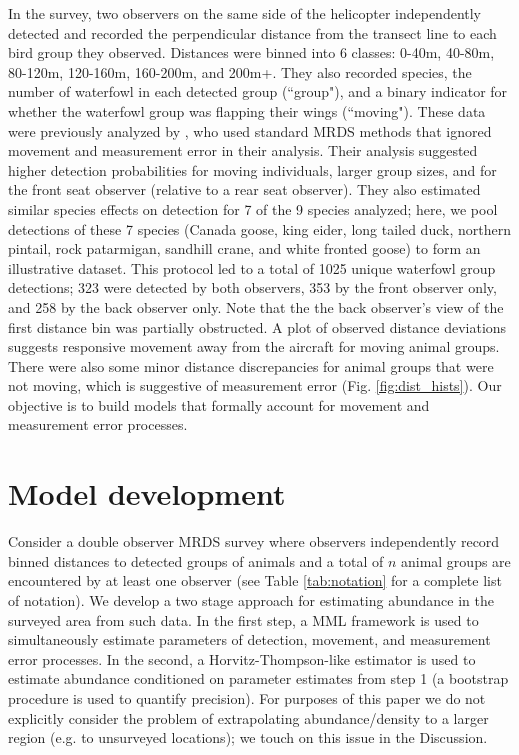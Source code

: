 \documentclass[12pt,fleqn]{article}
\begin{document}
In the survey, two observers on the same side of the helicopter independently detected and recorded the perpendicular distance from the transect line to each bird group they observed.  Distances were binned into 6 classes: 0-40m, 40-80m, 80-120m, 120-160m, 160-200m, and 200m+.  They also recorded species, the number of waterfowl in each detected group (``group"), and a binary indicator for whether the waterfowl group was flapping their wings (``moving").  These data were previously analyzed by \citet{AlisauskasConn2017}, who used standard MRDS methods that ignored movement and measurement error in their analysis.  Their analysis suggested higher detection probabilities for moving individuals, larger group sizes, and for the front seat observer (relative to a rear seat observer).  They also estimated similar species effects on detection for 7 of the 9 species analyzed; here, we pool detections of these 7 species (Canada goose, king eider, long tailed duck, northern pintail, rock patarmigan, sandhill crane, and white fronted goose) to form an illustrative dataset.  This protocol led to a total of 1025 unique waterfowl group detections; 323 were detected by both observers, 353 by the front observer only, and 258 by the back observer only.  Note that the the back observer's view of the first distance bin was partially obstructed.  A plot of observed distance deviations suggests responsive movement away from the aircraft for moving animal groups.  There were also some minor distance discrepancies for animal groups that were not moving, which is suggestive of measurement error (Fig. \ref{fig:dist_hists}).  Our objective is to build models that formally account for movement and measurement error processes.

\section{Model development}


Consider a double observer MRDS survey where observers independently record binned distances to detected groups of animals and a total of $n$ animal groups are encountered by at least one observer (see Table \ref{tab:notation} for a complete list of notation).  We develop a two stage approach for estimating abundance in the surveyed area from such data.  In the first step, a MML framework is used to simultaneously estimate parameters of detection, movement, and measurement error processes.  In the second, a Horvitz-Thompson-like estimator is used to estimate abundance conditioned on parameter estimates from step 1 (a bootstrap procedure is used to quantify precision).  For purposes of this paper we do not explicitly consider the problem of extrapolating abundance/density to a larger region (e.g. to unsurveyed locations); we touch on this issue in the Discussion.
\end{document}
